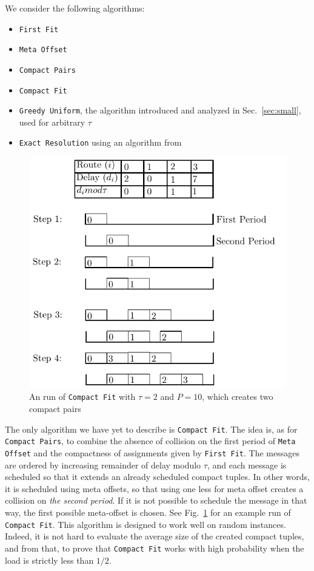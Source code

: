\documentclass[a4paper,UKenglish,cleveref, autoref, thm-restate]{lipics-v2019}
\newcommand\firstfit{\texttt{First Fit}\xspace}
\newcommand\compactpair{\texttt{Compact Pairs}\xspace}
\newcommand\metaoffset{\texttt{Meta Offset}\xspace}
\newcommand\greedyuniform{\texttt{Greedy Uniform}\xspace}
\newcommand\compactfit{\texttt{Compact Fit}\xspace}
\begin{document}
We consider the following algorithms:
\begin{itemize}
  \item \firstfit
  \item \metaoffset
  \item \compactpair
  \item \compactfit
  \item \greedyuniform, the algorithm introduced and analyzed in Sec.~\ref{sec:small}, used for arbitrary $\tau$
  \item \texttt{Exact Resolution} using an algorithm from~\cite{dominique2018deterministic}  
\end{itemize}

\begin{figure}[h]
 \begin{center}
\includegraphics[scale=1]{compactfit}
\end{center}
\caption{An run of \compactfit with $\tau = 2$ and $P=10$, which creates two compact pairs}
\label{fig:compactfit}
\end{figure}

The only algorithm we have yet to describe is \compactfit. The idea is, as for \compactpair, to combine the absence of collision on the first period of \metaoffset and the compactness of assignments given by \firstfit.
The messages are ordered by increasing remainder of delay modulo $\tau$, and each message is scheduled so that it extends an already scheduled compact tuples. 
In other words, it is scheduled using meta offsets, so that using one less for meta offset creates a collision on \emph{the second period}. If it is not possible to schedule the message in that way, the first possible meta-offset is chosen. See Fig.~\ref{fig:compactfit} for an example run of \compactfit. This algorithm is designed to work well on random instances. Indeed, it 
is not hard to evaluate the average size of the created compact tuples, and from that, to prove that \compactfit works with high probability when the load is strictly less than $1/2$.
\end{document}
